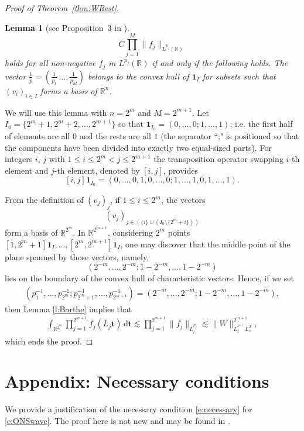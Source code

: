 \documentclass[a4paper]{amsart}
\numberwithin{equation}{section}%
\theoremstyle{plain}%
\newtheorem{lemma}[theorem]{Lemma}
\theoremstyle{definition}
\theoremstyle{remark}%
\def\d{\mathrm{d}}
\newcommand{\R}{{\mathbb R}}
\begin{document}
\begin{proof}[Proof of Theorem~\ref{thm:WRest}]
\begin{lemma}[see Proposition~3 in \cite{Barthe98}]
\[C\prod_{j=1}^M\|f_j\|_{L^{p_j}(\mathbb R)}
\]
holds for all non-negative $f_j$ in $L^{p_j}(\mathbb{R})$ if and only if the following holds. The vector $\frac1p=(\frac{1}{p_1}\,\dots,\frac{1}{p_M})$ belongs to the convex hull of $\textbf{1}_I$ for subsets such that $(v_i)_{i\in I}$ forms a basis of $\mathbb R^n$.
\end{lemma}
We will use this lemma with $n= 2^m$ and $M=2^{m+1}$. 
Let $I_0=\{2^{m}+1,2^{m}+2, \dots,2^{m+1}\}$ so that $\textbf{1}_{I_0}=(0,\dots,0;1,\dots,1)$; i.e. the first half of elements are all $0$ and the rests are all $1$ (the separator ``;" is positioned so that the components have been divided into exactly two equal-sized parts). 
For integers $i$, $j$ with $1\leq i \leq 2^m <  j\leq 2^{m+1}$ the transposition operator swapping $i$-th element and $j$-th element, denoted by $[i,j]$, provides
\[
[i,j]\textbf{1}_{I_0}
=
(0,\dots,0,1,0,\dots,0;1,\dots,1,0,1,\dots,1).
\]

From the definition of $(v_j)_j$, if $1\leq i \leq 2^m$, the vectors 
\[
(v_j)_{j \in (\{i\} \cup (I_0\setminus \{2^m + i\}))}
\]
form a basis of $\R^{2^m}$. 
In $\mathbb R^{2^{m+1}}$, considering $2^{m}$ points $[1,2^{m}+1]\textbf{1}_I, \dots, [2^{m},2^{m+1}]\textbf{1}_I$, one may discover that the middle point of the plane spanned by those vectors, namely, 
\[
(2^{-{m}},\dots,2^{-{m}};1-2^{-{m}},\dots, 1-2^{-{m}})
\]
lies on the boundary of the convex hull of characteristic vectors. 
Hence, if we set
\begin{align*}
(p_1^{-1},\dots, p_{2^{m}}^{-1};p_{2^{m}+1}^{-1},\dots,p_{2^{m+1}}^{-1}) =
(2^{-{m}},\dots,2^{-{m}};1-2^{-{m}},\dots, 1-2^{-{m}}),
\end{align*}
then Lemma \ref{l:Barthe} implies that
\begin{align*}
\int_{\mathbb R^{2^{m}}}\prod_{j=1}^{2^{m+1}}f_j(L_j\textbf{t})\,\d\textbf{t}
\lesssim
\prod_{j=1}^{2^{m+1}}\|f_j\|_{L_t^{p_j}} \lesssim \|W\|_{L_t^{^{2^{m+1}}}L_x^2}^{2^{m+1}},
\end{align*}
which ends the proof.
\end{proof}





\section*{Appendix: Necessary conditions} \label{appendix}
We provide a justification of the necessary condition \eqref{e:necessary} for \eqref{e:ONSwave}. The proof here is not new and may be found in \cite[Proposition 9]{BLN_Forum}. 
\end{document}

